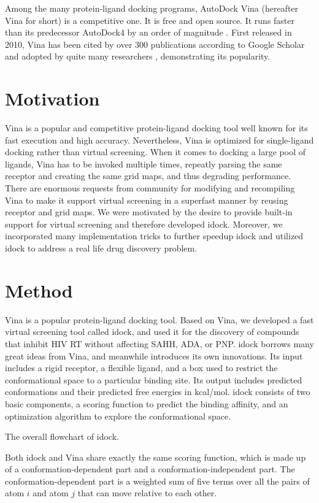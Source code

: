 \documentclass[10pt,conference,compsocconf]{../IEEEtran}
\begin{document}
Among the many protein-ligand docking programs, AutoDock Vina \cite{595} (hereafter Vina for short) is a competitive one. It is free and open source. It runs faster than its predecessor AutoDock4 \cite{596} by an order of magnitude \cite{556}. First released in 2010, Vina has been cited by over 300 publications according to Google Scholar and adopted by quite many researchers \cite{609}, demonstrating its popularity.

\section{Motivation}

Vina is a popular and competitive protein-ligand docking tool well known for its fast execution and high accuracy. Nevertheless, Vina is optimized for single-ligand docking rather than virtual screening. When it comes to docking a large pool of ligands, Vina has to be invoked multiple times, repeatly parsing the same receptor and creating the same grid maps, and thus degrading performance. There are enormous requests from community for modifying and recompiling Vina to make it support virtual screening in a superfast manner by reusing receptor and grid maps. We were motivated by the desire to provide built-in support for virtual screening and therefore developed idock. Moreover, we incorporated many implementation tricks to further speedup idock and utilized idock to address a real life drug discovery problem.

\section{Method}

Vina is a popular protein-ligand docking tool. Based on Vina, we developed a fast virtual screening tool called idock, and used it for the discovery of compounds that inhibit HIV RT without affecting SAHH, ADA, or PNP. idock borrows many great ideas from Vina, and meanwhile introduces its own innovations. Its input includes a rigid receptor, a flexible ligand, and a box used to restrict the conformational space to a particular binding site. Its output includes predicted conformations and their predicted free energies in kcal/mol. idock consists of two basic components, a scoring function to predict the binding affinity, and an optimization algorithm to explore the conformational space.

The overall flowchart of idock.

Both idock and Vina share exactly the same scoring function, which is made up of a conformation-dependent part and a conformation-independent part. The conformation-dependent part is a weighted sum of five terms over all the pairs of atom $i$ and atom $j$ that can move relative to each other.
\end{document}
